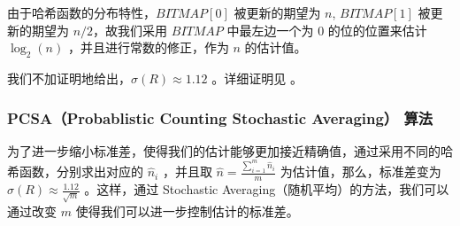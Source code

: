 \documentclass{ctexart}
\begin{document}
    由于哈希函数的分布特性，$BITMAP[0]$ 被更新的期望为 $n$, $BITMAP[1]$ 被更新的期望为 $n / 2$，故我们采用 $BITMAP$ 中最左边一个为 $0$ 的位的位置来估计 $\log_2(n)$ ，并且进行常数的修正，作为 $n$ 的估计值。

    我们不加证明地给出，$\sigma(R) \approx 1.12$ 。详细证明见 \cite{Flajolet:1985ixa} 。

\subsubsection{PCSA（Probablistic Counting Stochastic Averaging） 算法}

    为了进一步缩小标准差，使得我们的估计能够更加接近精确值，通过采用不同的哈希函数，分别求出对应的 $\hat{n}_i$ ，并且取 $\hat{n} = \frac{\sum_{i=1}^m{\hat{n}_i}}{m}$ 为估计值，那么，标准差变为 $\sigma(R) \approx \frac{1.12}{\sqrt{m}}$ 。这样，通过 Stochastic Averaging（随机平均）的方法，我们可以通过改变 $m$ 使得我们可以进一步控制估计的标准差。

\printbibliography[title=引用文献]
\end{document}
